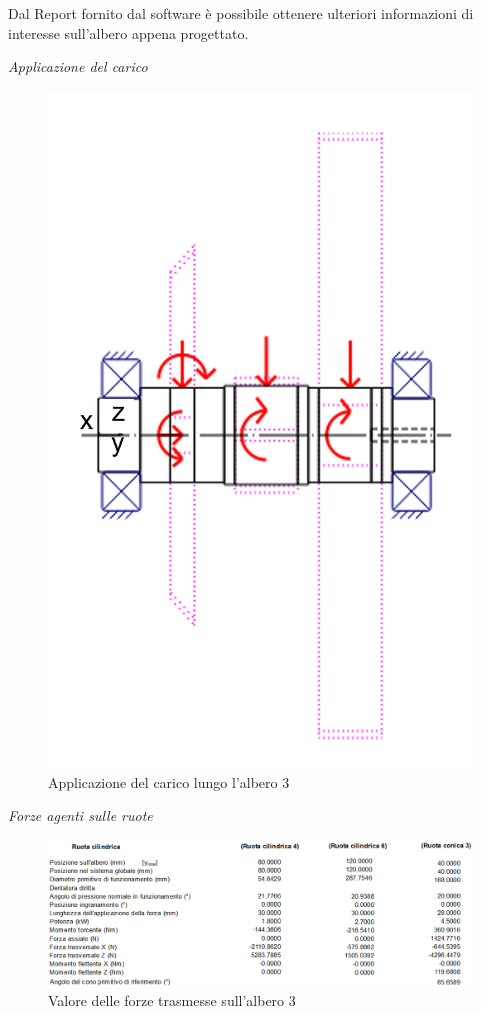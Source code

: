 Dal Report fornito dal software è possibile ottenere ulteriori informazioni di interesse sull'albero appena progettato. 

\emph{Applicazione del carico}
\begin{figure}[h]
    \centering
    \includegraphics[scale=0.5]{Immagini/Carico3Albero3.png}
    \caption{Applicazione del carico lungo l'albero 3}
    \label{fig:Carico3Albero3}
\end{figure}
\newpage
\emph{Forze agenti sulle ruote}
\begin{figure}[h]
    \centering
    \includegraphics[scale=0.5]{Immagini/Forze3RuoteAlbero3.png}
    \caption{Valore delle forze trasmesse sull'albero 3}
    \label{fig:Forze3RuoteAlbero3}
\end{figure}

